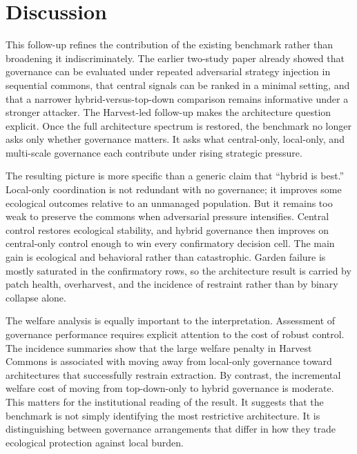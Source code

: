 \section{Discussion}

This follow-up refines the contribution of the existing benchmark rather than broadening it indiscriminately. The earlier two-study paper already showed that governance can be evaluated under repeated adversarial strategy injection in sequential commons, that central signals can be ranked in a minimal setting, and that a narrower hybrid-versus-top-down comparison remains informative under a stronger attacker. The Harvest-led follow-up makes the architecture question explicit. Once the full architecture spectrum is restored, the benchmark no longer asks only whether governance matters. It asks what central-only, local-only, and multi-scale governance each contribute under rising strategic pressure.

The resulting picture is more specific than a generic claim that ``hybrid is best.'' Local-only coordination is not redundant with no governance; it improves some ecological outcomes relative to an unmanaged population. But it remains too weak to preserve the commons when adversarial pressure intensifies. Central control restores ecological stability, and hybrid governance then improves on central-only control enough to win every confirmatory decision cell. The main gain is ecological and behavioral rather than catastrophic. Garden failure is mostly saturated in the confirmatory rows, so the architecture result is carried by patch health, overharvest, and the incidence of restraint rather than by binary collapse alone.

The welfare analysis is equally important to the interpretation. Assessment of governance performance requires explicit attention to the cost of robust control. The incidence summaries show that the large welfare penalty in Harvest Commons is associated with moving away from local-only governance toward architectures that successfully restrain extraction. By contrast, the incremental welfare cost of moving from top-down-only to hybrid governance is moderate. This matters for the institutional reading of the result. It suggests that the benchmark is not simply identifying the most restrictive architecture. It is distinguishing between governance arrangements that differ in how they trade ecological protection against local burden.

